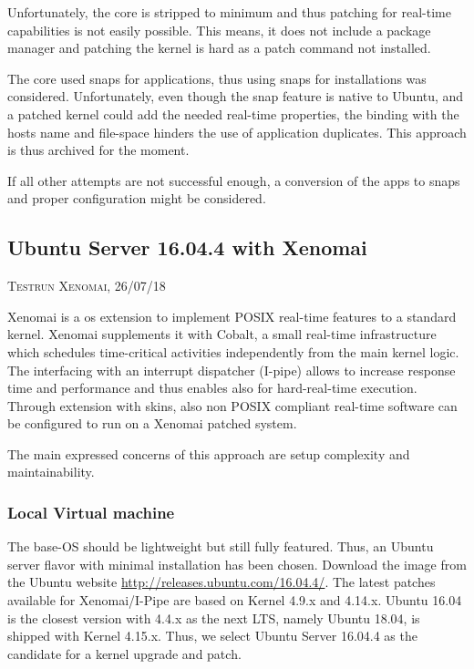 \documentclass[]{scrartcl}
\begin{document}
Unfortunately, the core is stripped to minimum and thus patching for real-time capabilities is not easily possible. This means, it does not include a package manager and patching the kernel is hard as a patch command not installed.

The core used snaps for applications, thus using snaps for installations was considered. Unfortunately, even though the snap feature is native to Ubuntu, and a patched kernel could add the needed real-time properties, the binding with the hosts name and file-space hinders the use of application duplicates. This approach is thus archived for the moment.

If all other attempts are not successful enough, a conversion of the apps to snaps and proper configuration might be considered.

\subsection{Ubuntu Server 16.04.4 with Xenomai}

{\small\textsc{Testrun Xenomai, 26/07/18} \bigskip}

Xenomai is a os extension to implement POSIX real-time features to a standard kernel. Xenomai supplements it with Cobalt, a small real-time infrastructure which schedules time-critical activities independently from the main kernel logic. The interfacing with an interrupt dispatcher (I-pipe) allows to increase response time and performance and thus enables also for hard-real-time execution. Through extension with skins, also non POSIX compliant real-time software can be configured to run on a Xenomai patched system.

The main expressed concerns of this approach are setup complexity and maintainability.

\subsubsection{Local Virtual machine}
\label{sec:xenoinst}

The base-OS should be lightweight but still fully featured. Thus, an Ubuntu server flavor with minimal installation has been chosen. Download the image from the Ubuntu website \url{http://releases.ubuntu.com/16.04.4/}. The latest patches available for Xenomai/I-Pipe are based on Kernel 4.9.x and 4.14.x. Ubuntu 16.04 is the closest version with 4.4.x as the next LTS, namely Ubuntu 18.04, is shipped with Kernel 4.15.x. Thus, we select Ubuntu Server 16.04.4 as the candidate for a kernel upgrade and patch.
\end{document}
